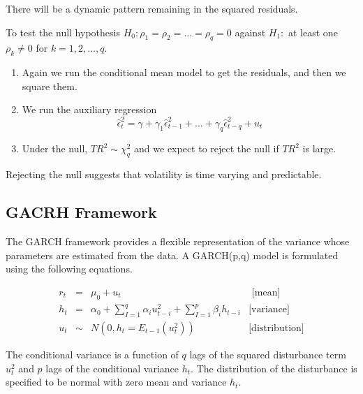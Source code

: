 \documentclass[11pt]{article}
\begin{document}
There will be a dynamic pattern remaining in the squared residuals.

\begin{procedure}

To test the null hypothesis $H_0: \rho_1 = \rho_2 = \ldots = \rho_q = 0$ against $H_1:$ at least one $\rho_k \neq0$ for $k = 1,2,\ldots, q$.

\begin{enumerate}

\item Again we run the conditional mean model to get the residuals, and then we square them.

\item We run the auxiliary regression
\[\hat{\epsilon}_{t}^2 = \gamma + \gamma_1 \hat{\epsilon}_{t-1}^2 + \ldots + \gamma_q \hat{\epsilon}_{t-q}^2 + u_t \]

\item Under the null, $TR^2\sim \chi_q^2$ and we expect to reject the null if $TR^2$ is large.

\end{enumerate}

Rejecting the null suggests that volatility is time varying and predictable.

\end{procedure}

\subsection{GACRH Framework}

The GARCH framework provides a flexible representation of the variance whose parameters are estimated from the data. A GARCH(p,q) model is formulated using the following equations.

\begin{equation}
\begin{array}{cccc}
r_t & = & \mu_0 + u_t & \text{ [mean]} \\
h_t & = & \alpha_0 + \sum_{I=1}^q \alpha_i u_{t-i}^2 + \sum_{I=1}^p \beta_i h_{t-i} & \text{[variance]} \\
u_t & \sim & N(0,h_t = E_{t-1}(u_t^2)) & \text{[distribution]}
\end{array}
\end{equation}

The conditional variance is a function of $q$ lags of the squared disturbance term $u_t^2$ and $p$ lags of the conditional variance $h_t$. The distribution of the disturbance is specified to be normal with zero mean and variance $h_t$.
\end{document}
